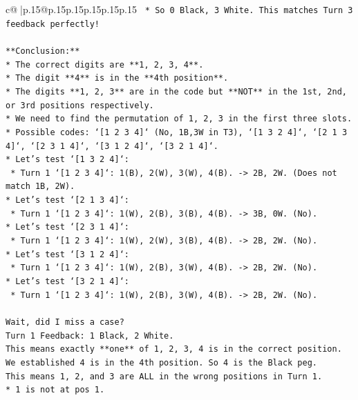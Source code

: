 \documentclass{article}
\begin{document}
{\begin{supertabular}{c@{$\;$}|p{.15\linewidth}@{}p{.15\linewidth}p{.15\linewidth}p{.15\linewidth}p{.15\linewidth}p{.15\linewidth}}
{{{\texttt{        *   So 0 Black, 3 White. This matches Turn 3 feedback perfectly!} \\
\\ 
\texttt{**Conclusion:**} \\
\texttt{*   The correct digits are **1, 2, 3, 4**.} \\
\texttt{*   The digit **4** is in the **4th position**.} \\
\texttt{*   The digits **1, 2, 3** are in the code but **NOT** in the 1st, 2nd, or 3rd positions respectively.} \\
\texttt{*   We need to find the permutation of 1, 2, 3 in the first three slots.} \\
\texttt{*   Possible codes: `{[}1 2 3 4{]}` (No, 1B,3W in T3), `{[}1 3 2 4{]}`, `{[}2 1 3 4{]}`, `{[}2 3 1 4{]}`, `{[}3 1 2 4{]}`, `{[}3 2 1 4{]}`.} \\
\texttt{*   Let's test `{[}1 3 2 4{]}`:} \\
\texttt{    *   Turn 1 `{[}1 2 3 4{]}`: 1(B), 2(W), 3(W), 4(B). {-}> 2B, 2W. (Does not match 1B, 2W).} \\
\texttt{*   Let's test `{[}2 1 3 4{]}`:} \\
\texttt{    *   Turn 1 `{[}1 2 3 4{]}`: 1(W), 2(B), 3(B), 4(B). {-}> 3B, 0W. (No).} \\
\texttt{*   Let's test `{[}2 3 1 4{]}`:} \\
\texttt{    *   Turn 1 `{[}1 2 3 4{]}`: 1(W), 2(W), 3(B), 4(B). {-}> 2B, 2W. (No).} \\
\texttt{*   Let's test `{[}3 1 2 4{]}`:} \\
\texttt{    *   Turn 1 `{[}1 2 3 4{]}`: 1(W), 2(B), 3(W), 4(B). {-}> 2B, 2W. (No).} \\
\texttt{*   Let's test `{[}3 2 1 4{]}`:} \\
\texttt{    *   Turn 1 `{[}1 2 3 4{]}`: 1(W), 2(B), 3(W), 4(B). {-}> 2B, 2W. (No).} \\
\\ 
\texttt{Wait, did I miss a case?} \\
\texttt{Turn 1 Feedback: 1 Black, 2 White.} \\
\texttt{This means exactly **one** of 1, 2, 3, 4 is in the correct position.} \\
\texttt{We established 4 is in the 4th position. So 4 is the Black peg.} \\
\texttt{This means 1, 2, and 3 are ALL in the wrong positions in Turn 1.} \\
\texttt{*   1 is not at pos 1.} \\
}}}
\end{supertabular}}
\end{document}
